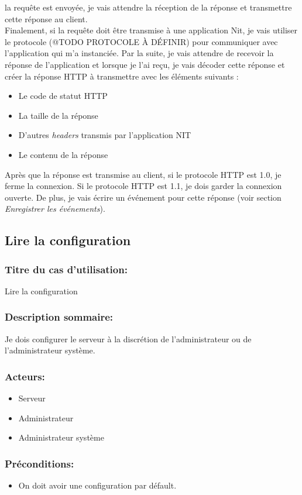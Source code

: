 \documentclass{scrreprt}
\begin{document}
la requête est envoyée, je vais attendre la réception de la réponse et transmettre
cette réponse au client.
\\
Finalement, si la requête doit être transmise à une application Nit, je vais utiliser
le protocole (@TODO PROTOCOLE À DÉFINIR) pour communiquer avec l'application
qui m'a instanciée. Par la suite, je vais attendre de recevoir la réponse de l'application
et lorsque je l'ai reçu, je vais décoder cette réponse et créer la réponse HTTP
à transmettre avec les éléments suivants :
\begin{itemize}
    \item Le code de statut HTTP
    \item La taille de la réponse
    \item D'autres \textit{headers} transmis par l'application NIT
    \item Le contenu de la réponse
\end{itemize}
Après que la réponse est transmise au client, si le protocole HTTP est 1.0, je ferme
la connexion. Si le protocole HTTP est 1.1, je dois garder la connexion
ouverte. De plus, je vais écrire un événement pour cette réponse (voir section
\textit{Enregistrer les événements}).


\subsection{Lire la configuration}
\subsubsection{Titre du cas d'utilisation:} Lire la configuration
\subsubsection{Description sommaire:}Je dois configurer le serveur à la discrétion de l'administrateur ou de l'administrateur système. 
\subsubsection{Acteurs:}
\begin{itemize}
    \item Serveur
    \item Administrateur
    \item Administrateur système
\end{itemize}
\subsubsection{Préconditions:}
\begin{itemize}
    \item On doit avoir une configuration par défault.
\end{itemize} 
\end{document}
